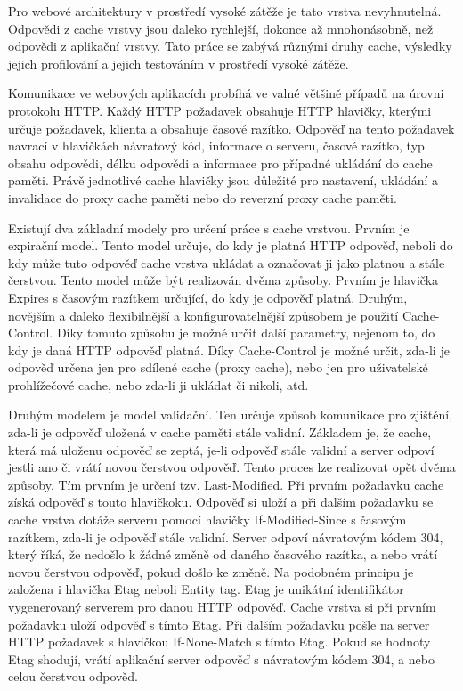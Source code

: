 \documentclass[12pt]{article}
\begin{document}
Pro webové architektury v prostředí vysoké zátěže je tato vrstva nevyhnutelná. Odpovědi z cache vrstvy jsou daleko rychlejší, dokonce až mnohonásobně, než odpovědi z aplikační vrstvy. Tato práce se zabývá různými druhy cache, výsledky jejich profilování a jejich testováním v prostředí vysoké zátěže.

\obrazek
{}

\label{sec:http-headers}
Komunikace ve webových aplikacích probíhá ve valné většině případů na úrovni protokolu HTTP. Každý HTTP požadavek obsahuje HTTP hlavičky, kterými určuje požadavek, klienta a obsahuje časové razítko. Odpověď na tento požadavek navrací v hlavičkách návratový kód, informace o serveru, časové razítko, typ obsahu odpovědi, délku odpovědi a informace pro případné ukládání do cache paměti. Právě jednotlivé cache hlavičky jsou důležité pro nastavení, ukládání a invalidace do proxy cache paměti nebo do reverzní proxy cache paměti.

Existují dva základní modely pro určení práce s cache vrstvou. Prvním je expirační model. Tento model určuje, do kdy je platná HTTP odpověď, neboli do kdy může tuto odpověď cache vrstva ukládat a označovat ji jako platnou a stále čerstvou. Tento model může být realizován dvěma způsoby. Prvním je hlavička Expires s časovým razítkem určující, do kdy je odpověď platná. Druhým, novějším a daleko flexibilnější a konfigurovatelnější způsobem je použití Cache-Control. Díky tomuto způsobu je možné určit další parametry, nejenom to, do kdy je daná HTTP odpověď platná. Díky Cache-Control je možné určit, zda-li je odpověď určena jen pro sdílené cache (proxy cache), nebo jen pro uživatelské prohlížečové cache, nebo zda-li ji ukládat či nikoli, atd.\cite{rfc-http}

Druhým modelem je model validační. Ten určuje způsob komunikace pro zjištění, zda-li je odpověď uložená v cache paměti stále validní. Základem je, že cache, která má uloženu odpověď se zeptá, je-li odpověď stále validní a server odpoví jestli ano či vrátí novou čerstvou odpověď. Tento proces lze realizovat opět dvěma způsoby. Tím prvním je určení tzv. Last-Modified. Při prvním požadavku cache získá odpověď s touto hlavičkoku. Odpověď si uloží a při dalším požadavku se cache vrstva dotáže serveru pomocí hlavičky If-Modified-Since s časovým razítkem, zda-li je odpověď stále validní. Server odpoví návratovým kódem 304, který říká, že nedošlo k žádné změně od daného časového razítka, a nebo vrátí novou čerstvou odpověď, pokud došlo ke změně. Na podobném principu je založena i hlavička Etag neboli Entity tag. Etag je unikátní identifikátor vygenerovaný serverem pro danou HTTP odpověď. Cache vrstva si při prvním požadavku uloží odpověď s tímto Etag. Při dalším požadavku pošle na server HTTP požadavek s hlavičkou If-None-Match s tímto Etag. Pokud se hodnoty Etag shodují, vrátí aplikační server odpověď s návratovým kódem 304, a nebo celou čerstvou odpověď.\cite{rfc-http}
\end{document}
